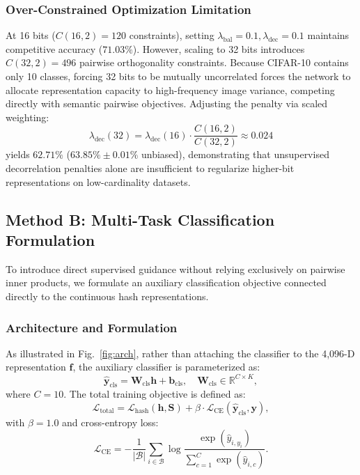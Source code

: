 \documentclass[10pt,conference]{IEEEtran}
\begin{document}
\subsubsection{Over-Constrained Optimization Limitation}
At 16 bits ($C(16, 2) = 120$ constraints), setting $\lambda_{\text{bal}} = 0.1, \lambda_{\text{dec}} = 0.1$ maintains competitive accuracy ($71.03\%$). However, scaling to 32 bits introduces $C(32, 2) = 496$ pairwise orthogonality constraints. Because CIFAR-10 contains only 10 classes, forcing 32 bits to be mutually uncorrelated forces the network to allocate representation capacity to high-frequency image variance, competing directly with semantic pairwise objectives. Adjusting the penalty via scaled weighting:
\begin{equation}
    \lambda_{\text{dec}}(32) = \lambda_{\text{dec}}(16) \cdot \frac{C(16, 2)}{C(32, 2)} \approx 0.024
\end{equation}
yields $62.71\%$ ($63.85\% \pm 0.01\%$ unbiased), demonstrating that unsupervised decorrelation penalties alone are insufficient to regularize higher-bit representations on low-cardinality datasets.

\subsection{Method B: Multi-Task Classification Formulation}
To introduce direct supervised guidance without relying exclusively on pairwise inner products, we formulate an auxiliary classification objective connected directly to the continuous hash representations.

\subsubsection{Architecture and Formulation}
As illustrated in Fig.~\ref{fig:arch}, rather than attaching the classifier to the 4,096-D representation $\mathbf{f}$, the auxiliary classifier is parameterized as:
\begin{equation}
    \hat{\mathbf{y}}_{\text{cls}} = \mathbf{W}_{\text{cls}} \mathbf{h} + \mathbf{b}_{\text{cls}}, \quad \mathbf{W}_{\text{cls}} \in \mathbb{R}^{C \times K},
\end{equation}
where $C = 10$. The total training objective is defined as:
\begin{equation}
    \mathcal{L}_{\text{total}} = \mathcal{L}_{\text{hash}}(\mathbf{h}, \mathbf{S}) + \beta \cdot \mathcal{L}_{\text{CE}}(\hat{\mathbf{y}}_{\text{cls}}, \mathbf{y}),
\end{equation}
with $\beta = 1.0$ and cross-entropy loss:
\begin{equation}
    \mathcal{L}_{\text{CE}} = - \frac{1}{|\mathcal{B}|} \sum_{i \in \mathcal{B}} \log \frac{\exp(\hat{y}_{i, y_i})}{\sum_{c=1}^C \exp(\hat{y}_{i, c})}.
\end{equation}
\end{document}
